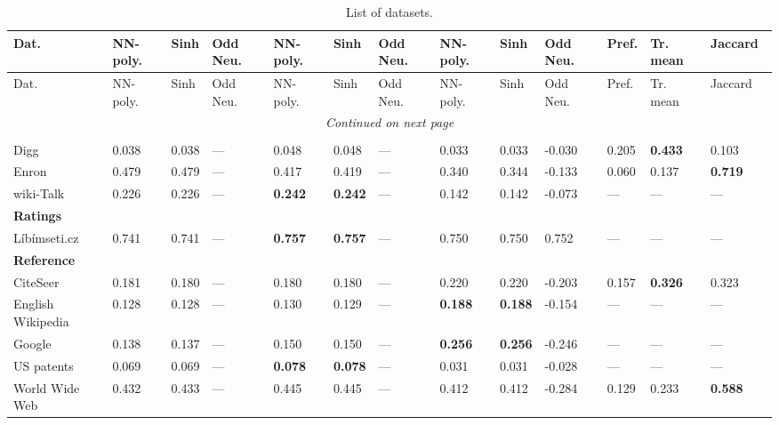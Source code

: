
\begin{longtable}{ lllllllllllll }

\caption[List of datasets]{List of datasets.} \\

Dat.            & NN-poly. & Sinh  & Odd Neu. & NN-poly. & Sinh  & Odd Neu. & NN-poly. & Sinh  & Odd Neu. & Pref. & Tr. mean & Jaccard \ \\
\hline

\endfirsthead

Dat.            & NN-poly. & Sinh  & Odd Neu. & NN-poly. & Sinh  & Odd Neu. & NN-poly. & Sinh  & Odd Neu. & Pref. & Tr. mean & Jaccard \ \\
\hline

\endhead

\hline
\multicolumn{13}{c}{\textit{Continued on next page}} \\* 
\hline

\endfoot

\hline \hline
\endlastfoot


\hline
\multicolumn{13}{|l|}{\textbf{Communication}} \\
\hline
Digg              & 0.038 & 0.038 & --- & 0.048 & 0.048 & --- & 0.033 & 0.033 & -0.030 & 0.205 & \bf{0.433} & 0.103 \\
Enron             & 0.479 & 0.479 & --- & 0.417 & 0.419 & --- & 0.340 & 0.344 & -0.133 & 0.060 & 0.137 & \bf{0.719} \\
wiki-Talk         & 0.226 & 0.226 & --- & \bf{0.242} & \bf{0.242} & --- & 0.142 & 0.142 & -0.073 & --- & --- & --- \\

\hline
\multicolumn{13}{|l|}{\textbf{Ratings}} \\
\hline
L\'ib\'imseti.cz  & 0.741 & 0.741 & --- & \bf{0.757} & \bf{0.757} & --- & 0.750 & 0.750 & 0.752 & --- & --- & --- \\

\hline
\multicolumn{13}{|l|}{\textbf{Reference}} \\
\hline
CiteSeer          & 0.181 & 0.180 & --- & 0.180 & 0.180 & --- & 0.220 & 0.220 & -0.203 & 0.157 & \bf{0.326} & 0.323 \\
English Wikipedia & 0.128 & 0.128 & --- & 0.130 & 0.129 & --- & \bf{0.188} & \bf{0.188} & -0.154 & --- & --- & --- \\
Google            & 0.138 & 0.137 & --- & 0.150 & 0.150 & --- & \bf{0.256} & \bf{0.256} & -0.246 & --- & --- & --- \\
US patents        & 0.069 & 0.069 & --- & \bf{0.078} & \bf{0.078} & --- & 0.031 & 0.031 & -0.028 & --- & --- & --- \\
World Wide Web    & 0.432 & 0.433 & --- & 0.445 & 0.445 & --- & 0.412 & 0.412 & -0.284 & 0.129 & 0.233 & \bf{0.588} \\


\end{longtable}
